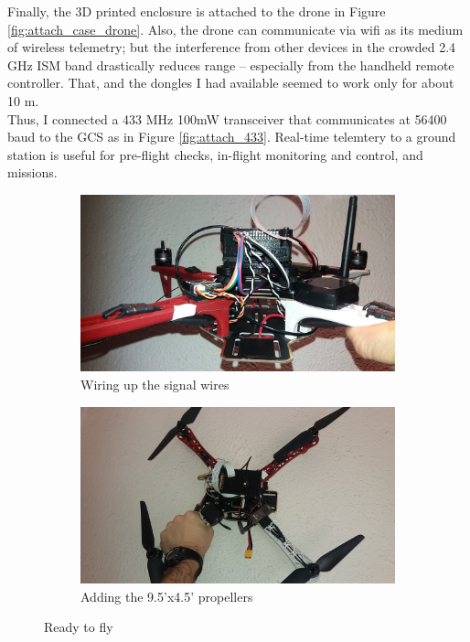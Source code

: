 Finally, the 3D printed enclosure is attached to the drone in Figure \ref{fig:attach_case_drone}. Also, the drone can communicate via wifi as its medium of wireless telemetry; but the interference from other devices in the crowded 2.4 GHz ISM band drastically reduces range -- especially from the handheld remote controller. That, and the dongles I had available seemed to work only for about 10 m.\\

Thus, I connected a 433 MHz 100mW transceiver that communicates at 56400 baud to the GCS as in Figure \ref{fig:attach_433}. Real-time telemtery to a ground station is useful for pre-flight checks, in-flight monitoring and control, and missions.

\begin{figure}[H]
\begin{subfigure}{0.5\textwidth}
\centering
\includegraphics[scale=0.1]{images/drone-build-signal-wires.jpg}
\caption{Wiring up the signal wires}
\label{fig:attach_sbus}
\end{subfigure}
\begin{subfigure}{0.5\textwidth}
\centering
\includegraphics[scale=0.1]{images/drone-build-props.jpg}
\caption{Adding the 9.5'x4.5' propellers}
\label{fig:attach_props}
\end{subfigure}
\caption{Ready to fly}
\label{fig:attach_signal_props}
\end{figure}

